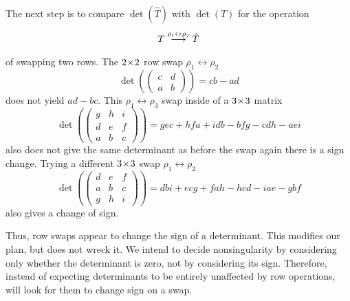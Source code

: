 The next step is to compare \( \det(\hat{T}) \) with 
\( \det(T) \) for the operation
\begin{equation*}
   T \mathrel{ \mathop{\longrightarrow}\limits^{ {\rho}_i \leftrightarrow {\rho}_j \mathstrut}_{ \begin{subarray}{l} \relax \end{subarray}}} \hat{T}
\end{equation*}
of swapping two rows.
The \(2 \! \times \! 2\) row swap $\rho_1\leftrightarrow\rho_2$
  \begin{equation*}
     \det(
       \begin{pmatrix}
         c  &d \\
         a  &b
       \end{pmatrix}
     )
     = cb - ad
  \end{equation*}
does not yield \( ad-bc \).
This $\rho_1\leftrightarrow\rho_3$ swap inside of a \(3 \! \times \! 3\) matrix
\begin{equation*}
   \det(
     \begin{pmatrix}
        g  &h  &i \\
        d  &e  &f \\
        a  &b  &c
     \end{pmatrix}
   )
   = gec + hfa + idb - bfg - cdh - aei
\end{equation*}
also does not give the same determinant as before the swap \Dash  again 
there is a sign change.
Trying a different \(3 \! \times \! 3\) swap $\rho_1\leftrightarrow\rho_2$ 
\begin{equation*}
   \det(
     \begin{pmatrix}
        d  &e  &f \\
        a  &b  &c \\
        g  &h  &i
     \end{pmatrix}
   )
   = dbi + ecg + fah - hcd - iae - gbf
\end{equation*}
also gives a change of sign.

Thus, row swaps appear 
to change the sign of a determinant.
This modifies our plan, but does not wreck it.
We intend to decide nonsingularity by considering
only whether the determinant is zero, not by considering its sign.
Therefore, instead of expecting determinants to be
entirely unaffected by row operations, will look for them to change sign
on a swap.

